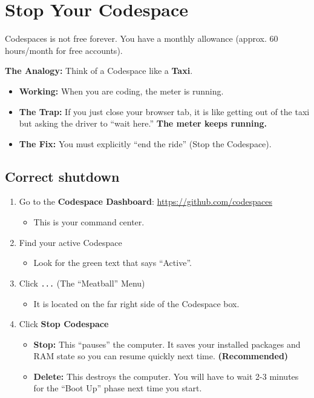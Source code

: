 \documentclass[
  letterpaper,
  DIV=11,
  numbers=noendperiod,
  oneside]{scrreprt}
\providecommand{\tightlist}{%
  \setlength{\itemsep}{0pt}\setlength{\parskip}{0pt}}
\begin{document}
\chapter{Stop Your Codespace}\label{stop-your-codespace}

Codespaces is not free forever. You have a monthly allowance (approx. 60
hours/month for free accounts).

\textbf{The Analogy:} Think of a Codespace like a \textbf{Taxi}.

\begin{itemize}
\tightlist
\item
  \textbf{Working:} When you are coding, the meter is running.
\item
  \textbf{The Trap:} If you just close your browser tab, it is like
  getting out of the taxi but asking the driver to ``wait here.''
  \textbf{The meter keeps running.}
\item
  \textbf{The Fix:} You must explicitly ``end the ride'' (Stop the
  Codespace).
\end{itemize}

\section{Correct shutdown}\label{correct-shutdown}

\begin{enumerate}
\def\labelenumi{\arabic{enumi}.}
\tightlist
\item
  Go to the \textbf{Codespace Dashboard}:
  \url{https://github.com/codespaces}

  \begin{itemize}
  \tightlist
  \item
    This is your command center.
  \end{itemize}
\item
  Find your active Codespace

  \begin{itemize}
  \tightlist
  \item
    Look for the green text that says ``Active''.
  \end{itemize}
\item
  Click \texttt{...} (The ``Meatball'' Menu)

  \begin{itemize}
  \tightlist
  \item
    It is located on the far right side of the Codespace box.
  \end{itemize}
\item
  Click \textbf{Stop Codespace}

  \begin{itemize}
  \tightlist
  \item
    \textbf{Stop:} This ``pauses'' the computer. It saves your installed
    packages and RAM state so you can resume quickly next time.
    \textbf{(Recommended)}
  \item
    \textbf{Delete:} This destroys the computer. You will have to wait
    2-3 minutes for the ``Boot Up'' phase next time you start.
  \end{itemize}
\end{enumerate}
\end{document}
